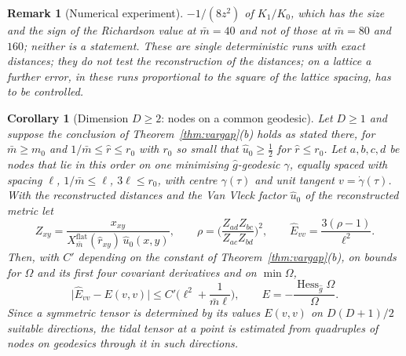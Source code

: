 \documentclass[11pt,a4paper]{article}
\theoremstyle{stmt}
\newtheorem{corollary}[theorem]{Corollary}
\theoremstyle{defn}
\theoremstyle{rmk}
\newtheorem{remark}[theorem]{Remark}
\numberwithin{equation}{section}
\begin{document}
{\begin{remark}[Numerical experiment]
$-1/(8z^2)$ of $K_1/K_0$, which has the size and the sign of the Richardson value at $\bar m=40$ and not of those at $\bar m=80$ and $160$; neither is a statement. These are single deterministic runs with exact distances; they do not test the reconstruction of the distances; on a lattice a further error, in these runs proportional to the square of the lattice spacing, has to be controlled.
\end{remark}

\begin{corollary}[Dimension $D\ge2$: nodes on a common geodesic]\label{cor:lapse-est-D}
Let $D\ge1$ and suppose the conclusion of Theorem~\ref{thm:vargap}(b) holds as stated there, for $\bar m\ge m_0$ and $1/\bar m\le\hat r\le r_0$ with $r_0$ so small that $\hat u_0\ge\frac12$ for $\hat r\le r_0$. Let $a,b,c,d$ be nodes that lie in this order on one minimising $\hat g$-geodesic $\gamma$, equally spaced with spacing $\ell$, $1/\bar m\le\ell$, $3\ell\le r_0$, with centre $\gamma(\tau)$ and unit tangent $v=\dot\gamma(\tau)$. With the reconstructed distances and the Van Vleck factor $\hat u_0$ of the reconstructed metric let
\[
Z_{xy}=\frac{x_{xy}}{X^{\mathrm{flat}}_{\bar m}(\hat r_{xy})\,\hat u_0(x,y)},\qquad\rho=\Big(\frac{Z_{ad}Z_{bc}}{Z_{ac}Z_{bd}}\Big)^2,\qquad\hat E_{vv}=\frac{3(\rho-1)}{\ell^2}.
\]
Then, with $C'$ depending on the constant of Theorem~\ref{thm:vargap}(b), on bounds for $\Omega$ and its first four covariant derivatives and on $\min\Omega$,
\[
\big|\hat E_{vv}-E(v,v)\big|\le C'\Big(\ell^2+\frac1{\bar m\ell}\Big),\qquad E=-\frac{\operatorname{Hess}_{\hat g}\Omega}{\Omega}.
\]
Since a symmetric tensor is determined by its values $E(v,v)$ on $D(D+1)/2$ suitable directions, the tidal tensor at a point is estimated from quadruples of nodes on geodesics through it in such directions.
\end{corollary}

}
\end{document}
